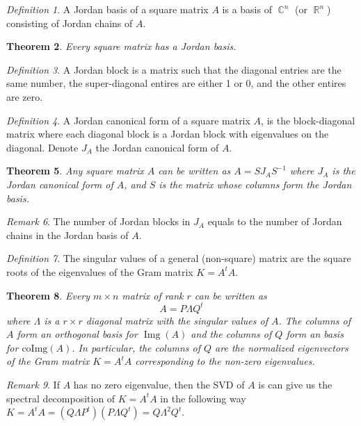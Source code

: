 \documentclass[12pt]{amsart}
\DeclareMathOperator{\rr}{\mathbb{R}}
\DeclareMathOperator{\cc}{\mathbb{C}}
\DeclareMathOperator{\img}{Img}
\newtheorem{theorem}{Theorem}[section]
\theoremstyle{remark}
\newtheorem{remark}[theorem]{Remark}
\newtheorem{definition}[theorem]{Definition}
\numberwithin{equation}{section}
\begin{document}
	\begin{definition}
		A Jordan basis of a square matrix $A$ is a basis of $\cc^n$ (or $\rr^n$) consisting of Jordan chains of $A$.
	\end{definition}
	\begin{theorem}
		Every square matrix has a Jordan basis.
	\end{theorem}
	\begin{definition}
		A Jordan block is a matrix such that the diagonal entries are the same number, the super-diagonal entires are either 1 or 0, and the other entires are zero.
	\end{definition}
	
	\begin{definition}
		A Jordan canonical form of a square matrix $A$, is the block-diagonal matrix where each diagonal block is a Jordan block with eigenvalues on the diagonal. Denote $J_A$ the Jordan canonical form of $A$.
	\end{definition}
	
	\begin{theorem}
		Any square matrix $A$ can be written as $A=S J_A S^{-1}$ where $J_A$ is the Jordan canonical form of $A$, and $S$ is the matrix whose columns form the Jordan basis.
	\end{theorem}
\begin{remark}
	The number of Jordan blocks in $J_A$ equals to the number of Jordan chains in the Jordan basis of $A$.
\end{remark}

\begin{definition}
	The singular values of a general (non-square) matrix are the square roots of the eigenvalues of the Gram matrix $K=A^tA$.
\end{definition}
\begin{theorem}
	Every $m\times n$ matrix of rank $r$ can be written as
	\[A=P \Lambda Q^{t}\]
where $\Lambda$ is a $r\times r$ diagonal matrix with the singular values of $A$. The columns of $A$ form an orthogonal basis for $\img(A )$ and the columns of $Q$ form an basis for $ \text{coImg}(A)$. In particular, the columns of $Q$ are the normalized eigenvectors of the Gram matrix $K=A^tA$ corresponding to the non-zero eigenvalues.
\end{theorem}
\begin{remark}
	If $A$ has no zero eigenvalue, then the SVD of $A$ is can give us the spectral decomposition of $K=A^tA$ in the following way
	$K=A^tA=(Q\Lambda P^t)(P\Lambda Q^t)=Q\Lambda^2 Q^t$.
\end{remark}

	
\end{document}
